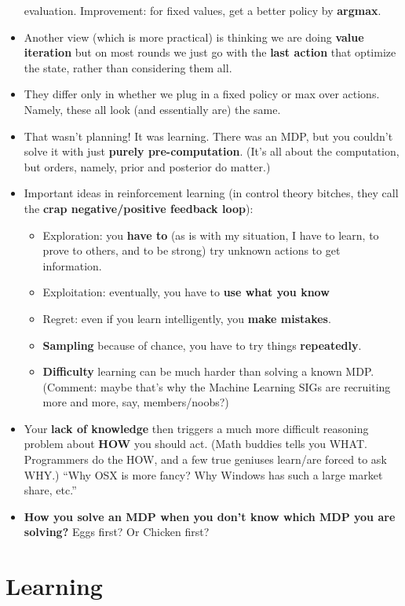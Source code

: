 \documentclass[twocolumn]{article}
\begin{document}
\begin{itemize}
  evaluation. Improvement: for fixed values, get a better policy by
  \textbf{argmax}. 
\item Another view (which is more practical) is thinking we are doing
  \textbf{value iteration} but on most rounds we just go with the \textbf{last
    action} that optimize the state, rather than considering them all.
\item They differ only in whether we plug in a fixed policy or max
  over actions. Namely, these all look (and essentially are) the same.
\item That wasn't planning! It was learning. There was an MDP, but you
  couldn't solve it with just \textbf{purely pre-computation}. (It's
  all about the computation, but orders, namely, prior and posterior
  do matter.)
\item Important ideas in reinforcement learning (in control theory
  bitches, they call the \textbf{crap negative/positive feedback
    loop}): 
  \begin{itemize}
  \item Exploration: you \textbf{have to} (as is with my situation, I
    have to learn, to prove to others, and to be strong) try unknown
    actions to get information.
  \item Exploitation: eventually, you have to \textbf{use what you
      know}
  \item Regret: even if you learn intelligently, you \textbf{make
      mistakes}. 
  \item \textbf{Sampling} because of chance, you have to try things
    \textbf{repeatedly}. 
  \item \textbf{Difficulty} learning can be much harder than solving a
    known MDP. (Comment: maybe that's why the Machine Learning SIGs
    are recruiting more and more, say, members/noobs?)
  \end{itemize}
\item Your \textbf{lack of knowledge} then triggers a much more
  difficult reasoning problem about \textbf{HOW} you should act. (Math
  buddies tells you WHAT. Programmers do the HOW, and a few true
  geniuses learn/are forced to ask WHY.) ``Why OSX is more fancy? Why
  Windows has such a large market share, etc.''
\item \textbf{How you solve an MDP when you don't know which MDP you
    are solving?} Eggs first? Or Chicken first?
\end{itemize}


\section{Learning}
\label{sec:learning}
\end{document}
